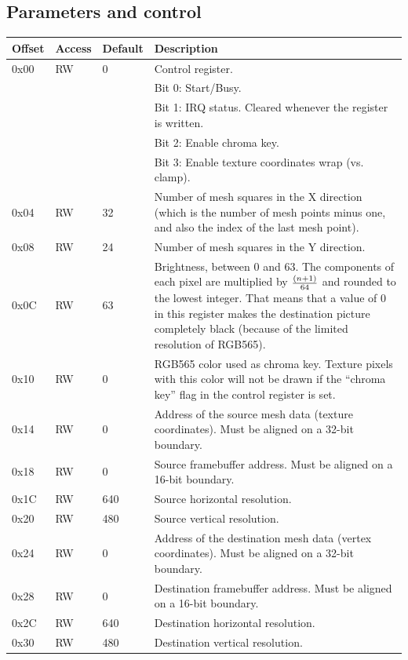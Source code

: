 \documentclass[a4paper,11pt]{article}
\begin{document}
\subsection{Parameters and control}
\begin{tabularx}{\textwidth}{|l|l|l|X|}
\hline
\bf{Offset} & \bf{Access} & \bf{Default} & \bf{Description} \\
\hline
0x00 & RW & 0 & Control register. \\
& & & Bit 0: Start/Busy.\\
& & & Bit 1: IRQ status. Cleared whenever the register is written. \\
& & & Bit 2: Enable chroma key. \\
& & & Bit 3: Enable texture coordinates wrap (vs. clamp). \\
\hline
0x04 & RW & 32 & Number of mesh squares in the X direction (which is the number of mesh points minus one, and also the index of the last mesh point). \\
\hline
0x08 & RW & 24 & Number of mesh squares in the Y direction. \\
\hline
0x0C & RW & 63 & Brightness, between 0 and 63. The components of each pixel are multiplied by $ (n+1) \over 64 $ and rounded to the lowest integer. That means that a value of 0 in this register makes the destination picture completely black (because of the limited resolution of RGB565). \\
\hline
0x10 & RW & 0 & RGB565 color used as chroma key. Texture pixels with this color will not be drawn if the ``chroma key'' flag in the control register is set. \\
\hline
0x14 & RW & 0 & Address of the source mesh data (texture coordinates). Must be aligned on a 32-bit boundary. \\
\hline
0x18 & RW & 0 & Source framebuffer address. Must be aligned on a 16-bit boundary. \\
\hline
0x1C & RW & 640 & Source horizontal resolution. \\
\hline
0x20 & RW & 480 & Source vertical resolution. \\
\hline
0x24 & RW & 0 & Address of the destination mesh data (vertex coordinates). Must be aligned on a 32-bit boundary. \\
\hline
0x28 & RW & 0 & Destination framebuffer address. Must be aligned on a 16-bit boundary. \\
\hline
0x2C & RW & 640 & Destination horizontal resolution. \\
\hline
0x30 & RW & 480 & Destination vertical resolution. \\
\hline
\end{tabularx}
\end{document}
